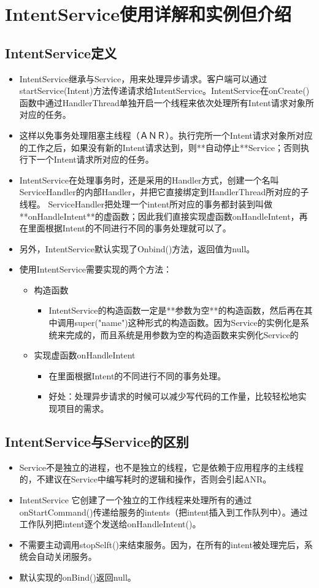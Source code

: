 \documentclass[9pt, b5paper]{article}
\begin{document}
\section{IntentService使用详解和实例但介绍}
\label{sec-4}
\subsection{IntentService定义}
\label{sec-4-1}
\begin{itemize}
\item IntentService继承与Service，用来处理异步请求。客户端可以通过startService(Intent)方法传递请求给IntentService。IntentService在onCreate()函数中通过HandlerThread单独开启一个线程来依次处理所有Intent请求对象所对应的任务。　
\item 这样以免事务处理阻塞主线程（ＡＮＲ）。执行完所一个Intent请求对象所对应的工作之后，如果没有新的Intent请求达到，则**自动停止**Service；否则执行下一个Intent请求所对应的任务。　
\item IntentService在处理事务时，还是采用的Handler方式，创建一个名叫ServiceHandler的内部Handler，并把它直接绑定到HandlerThread所对应的子线程。 ServiceHandler把处理一个intent所对应的事务都封装到叫做**onHandleIntent**的虚函数；因此我们直接实现虚函数onHandleIntent，再在里面根据Intent的不同进行不同的事务处理就可以了。
\item 另外，IntentService默认实现了Onbind()方法，返回值为null。
\item 使用IntentService需要实现的两个方法：
\begin{itemize}
\item 构造函数　
\begin{itemize}
\item IntentService的构造函数一定是**参数为空**的构造函数，然后再在其中调用super("name")这种形式的构造函数。因为Service的实例化是系统来完成的，而且系统是用参数为空的构造函数来实例化Service的
\end{itemize}
\item 实现虚函数onHandleIntent
\begin{itemize}
\item 在里面根据Intent的不同进行不同的事务处理。　
\item 好处：处理异步请求的时候可以减少写代码的工作量，比较轻松地实现项目的需求。
\end{itemize}
\end{itemize}
\end{itemize}
\subsection{IntentService与Service的区别}
\label{sec-4-2}
\begin{itemize}
\item Service不是独立的进程，也不是独立的线程，它是依赖于应用程序的主线程的，不建议在Service中编写耗时的逻辑和操作，否则会引起ANR。
\item IntentService 它创建了一个独立的工作线程来处理所有的通过onStartCommand()传递给服务的intents（把intent插入到工作队列中）。通过工作队列把intent逐个发送给onHandleIntent()。　
\item 不需要主动调用stopSelft()来结束服务。因为，在所有的intent被处理完后，系统会自动关闭服务。
\item 默认实现的onBind()返回null。
\end{itemize}
\end{document}
